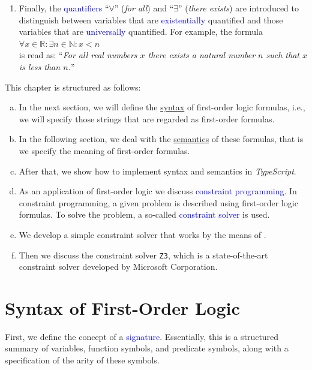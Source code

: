 \begin{enumerate}
      $x > 1 \rightarrow x + 7 < x \cdot  7$.
\item Finally, the \textcolor{blue}{quantifiers} ``$\forall$'' (\emph{for all}) and
      ``$\exists$'' (\emph{there exists}) are introduced to distinguish between variables that are
      \textcolor{blue}{existentially} quantified and those variables that are \textcolor{blue}{universally}
      quantified.  For example, the formula 
      \\[0.2cm]
      \hspace*{1.3cm}
      $\forall x \in \mathbb{R}: \exists n \in \mathbb{N}: x < n$
      \\[0.2cm]
      is read as: ``\textsl{For all real numbers $x$ there exists a natural number $n$ such that $x$ is less
        than $n$.}''
\end{enumerate}
This chapter is structured as follows:
\begin{enumerate}[(a)]
\item In the next section, we will define the \href{https://en.wikipedia.org/wiki/Syntax}{syntax} of
      first-order logic formulas, i.e., we will specify those strings that are regarded as first-order
      formulas.
\item In the following section, we deal with the
      \href{https://en.wikipedia.org/wiki/Semantics}{semantics} of these formulas, that is we specify the 
      meaning of first-order formulas.
\item After that, we show how to implement syntax and semantics in \textsl{TypeScript}.
\item As an application of first-order logic we discuss \textcolor{blue}{constraint programming}.
      In constraint programming, a given problem is described using first-order logic formulas.
      To solve the problem, a so-called \textcolor{blue}{constraint solver} is used.
\item We develop a simple constraint solver that works by the means of .
\item Then we discuss the constraint solver \texttt{Z3}, which is a state-of-the-art constraint solver
      developed by Microsoft Corporation.
\end{enumerate}

\section{Syntax of First-Order Logic}
First, we define the concept of a \textcolor{blue}{signature}. Essentially, this is a
structured summary of variables, function symbols, and predicate symbols, along with a specification of the
arity of these symbols. 


